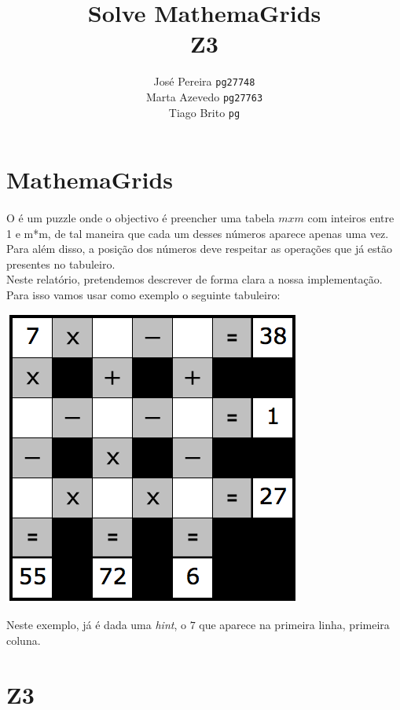 \documentclass{article}
\title{Solve MathemaGrids\\ Z3}
\author{José Pereira \texttt{pg27748} 
		\\ Marta Azevedo \texttt{pg27763}
		              \\ Tiago Brito \texttt{pg}}
\begin{document}
\maketitle
\section{MathemaGrids}

\paragraph{} 
O {} é um puzzle onde o objectivo é preencher uma tabela $mxm$ com inteiros entre 1 e m*m, de tal maneira que cada um desses números aparece apenas uma vez. 
\\

Para além disso, a posição dos números deve respeitar as operações que já estão presentes no tabuleiro.
\\
Neste relatório, pretendemos descrever de forma clara a nossa implementação.
\\

Para isso vamos usar como exemplo o seguinte tabuleiro:
\begin{center}
\includegraphics[scale=0.4]{exemplo_mathemagrids}
\end{center}

Neste exemplo, já é dada uma {\it{hint}}, o $7$ que aparece na primeira linha, primeira coluna.

\section{Z3}
\end{document}
